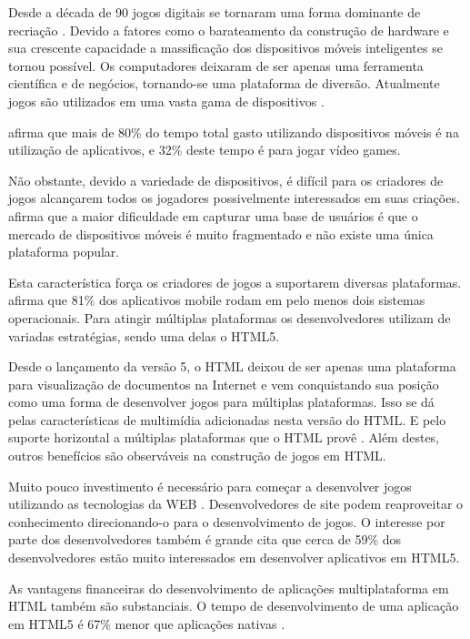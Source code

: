 
Desde a década de 90 jogos digitais se tornaram uma forma dominante
de recriação \autocite{gameDesignPatterns}. Devido a fatores como o
barateamento da construção de hardware e sua crescente capacidade a massificação
dos dispositivos móveis inteligentes se tornou possível. Os
computadores deixaram de ser apenas uma ferramenta científica e de
negócios, tornando-se uma plataforma de diversão. Atualmente jogos
são utilizados em uma vasta gama de dispositivos \autocite[pp.
6]{crossPlatformMobileGameDevelopment}.

\autocite{HTML5CrossPlatformGameDevelopment} afirma que mais de 80\% do
tempo total gasto utilizando dispositivos móveis é na utilização de
aplicativos, e 32\% deste tempo é para jogar vídeo games.

Não obstante, devido a variedade de dispositivos, é difícil para
os criadores de jogos alcançarem todos os jogadores possivelmente
interessados em suas criações. \cite{html5Tradeoffs} afirma que a
maior dificuldade em capturar uma base de usuários é que o mercado
de dispositivos móveis é muito fragmentado e não existe uma única
plataforma popular.

Esta característica força os criadores de jogos a suportarem diversas
plataformas. \autocite{htmlSurvey} afirma que 81\% dos aplicativos
mobile rodam em pelo menos dois sistemas operacionais. Para atingir
múltiplas plataformas os desenvolvedores utilizam de variadas
estratégias, sendo uma delas o HTML5.

Desde o lançamento da versão 5, o HTML deixou de ser apenas uma
plataforma para visualização de documentos na Internet e vem
conquistando sua posição como uma forma de desenvolver jogos
para múltiplas plataformas. Isso se dá pelas características de
multimídia adicionadas nesta versão do HTML. E pelo suporte horizontal
a múltiplas plataformas que o HTML provê \autocite{html5Tradeoffs}.
Além destes, outros benefícios são observáveis na construção de
jogos em HTML.

Muito pouco investimento é necessário para começar a desenvolver
jogos utilizando as tecnologias da WEB \autocite{html5mostwanted}.
Desenvolvedores de site podem reaproveitar o conhecimento direcionando-o
para o desenvolvimento de jogos. O interesse por parte dos
desenvolvedores também é grande \autocite{htmlSurvey} cita que cerca
de 59\% dos desenvolvedores estão muito interessados em desenvolver
aplicativos em HTML5.

As vantagens financeiras do desenvolvimento de aplicações
multiplataforma em HTML também são substanciais. O tempo de
desenvolvimento de uma aplicação em HTML5 é 67\% menor que
aplicações nativas \autocite[pp. 460]{html5Tradeoffs}.

